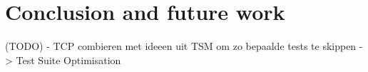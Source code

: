 \chapter{Conclusion and future work}

(TODO)
- TCP combieren met ideeen uit TSM om zo bepaalde tests te skippen -> Test Suite Optimisation